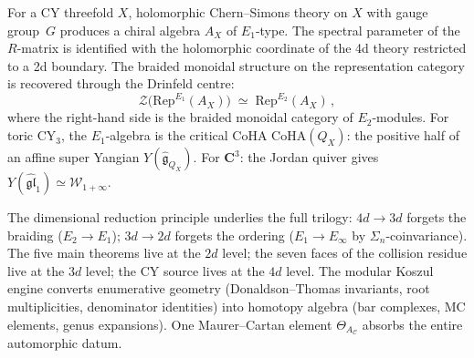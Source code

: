 \documentclass[11pt,reqno]{amsart}
\theoremstyle{definition}
\theoremstyle{remark}
\newcommand{\fg}{\mathfrak{g}}
\renewcommand{\Bbbk}{\mathbf{C}}
\numberwithin{equation}{section}
\begin{document}
For a CY threefold $X$, holomorphic Chern--Simons theory
on $X$ with gauge group~$G$ produces a chiral algebra
$A_X$ of $E_1$-type. The spectral parameter of the
$R$-matrix is identified with the holomorphic coordinate
of the 4d theory restricted to a 2d boundary. The
braided monoidal structure on the representation category is
recovered through the Drinfeld centre:
\begin{equation}\label{eq:drinfeld-centre}
\mathcal{Z}\bigl(\mathrm{Rep}^{E_1}(A_X)\bigr)
\;\simeq\;
\mathrm{Rep}^{E_2}(A_X)\,,
\end{equation}
where the right-hand side is the braided monoidal category of
$E_2$-modules. For toric CY$_3$, the $E_1$-algebra is the
critical CoHA $\mathrm{CoHA}(Q_X)$: the positive half of an
affine super Yangian $Y(\widehat{\fg}_{Q_X})$. For
$\Bbbk^3$: the Jordan quiver gives
$Y(\widehat{\mathfrak{gl}}_1) \simeq \mathcal{W}_{1+\infty}$.

The dimensional reduction principle underlies the full trilogy:
$4d \to 3d$ forgets the braiding ($E_2 \to E_1$); $3d \to 2d$
forgets the ordering ($E_1 \to E_\infty$ by
$\Sigma_n$-coinvariance). The five main theorems live at the
$2d$ level; the seven faces of the collision residue live at
the $3d$ level; the CY source lives at the $4d$ level. The
modular Koszul engine converts enumerative geometry
(Donaldson--Thomas invariants, root multiplicities, denominator
identities) into homotopy algebra (bar complexes, MC elements,
genus expansions). One Maurer--Cartan element
$\Theta_{A_\mathcal{C}}$ absorbs the entire automorphic datum.









\end{document}
